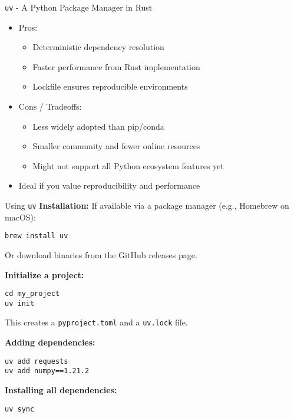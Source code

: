 \documentclass[aspectratio=169]{beamer}
\begin{document}
%
%
\begin{frame}{\texttt{uv} - A Python Package Manager in Rust}
\begin{itemize}
\item Pros:
  \begin{itemize}
    \item Deterministic dependency resolution
    \item Faster performance from Rust implementation
    \item Lockfile ensures reproducible environments
  \end{itemize}
\item Cons / Tradeoffs:
  \begin{itemize}
    \item Less widely adopted than pip/conda
    \item Smaller community and fewer online resources
    \item Might not support all Python ecosystem features yet
  \end{itemize}
\item Ideal if you value reproducibility and performance
\end{itemize}
\end{frame}

\begin{frame}[fragile]{Using \texttt{uv}}
\textbf{Installation:}
If available via a package manager (e.g., Homebrew on macOS):
\begin{verbatim}
brew install uv
\end{verbatim}

Or download binaries from the GitHub releases page.

\textbf{Initialize a project:}
\begin{verbatim}
cd my_project
uv init
\end{verbatim}

This creates a \texttt{pyproject.toml} and a \texttt{uv.lock} file.

\textbf{Adding dependencies:}
\begin{verbatim}
uv add requests
uv add numpy==1.21.2
\end{verbatim}

\textbf{Installing all dependencies:}
\begin{verbatim}
uv sync
\end{verbatim}
\end{frame}
\end{document}
